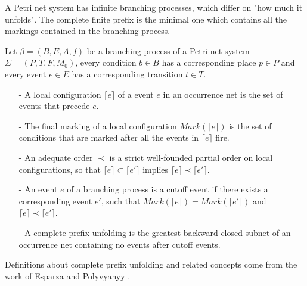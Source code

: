 \documentclass{llncs}
\begin{document}
A Petri net system has infinite branching processes, which differ on "how much it unfolds". The complete finite prefix is the minimal one which contains all the markings contained in the branching process.

\begin{definition}\label{def:cpu}
Let $\beta=(B,E,A,f)$ be a branching process of a Petri net system $\Sigma=(P,T,F,M_{0})$, every condition $b\in B$ has a corresponding place $p\in P$ and every event $e\in E$ has a corresponding transition $t\in T$.
	\begin{itemize}
		\item[-] A local configuration $\lceil e\rceil$ of a event $e$ in an occurrence net is the set of events that precede $e$.
		\item[-] The final marking of a local configuration $Mark(\lceil e\rceil)$ is the set of conditions that are marked after all the events in $\lceil e\rceil$ fire.
		\item[-] An adequate order $\prec$ is a strict well-founded partial order on local configurations, so that $\lceil e\rceil\subset\lceil e'\rceil$ implies $\lceil e\rceil\prec\lceil e'\rceil$.
		\item[-] An event $e$ of a branching process is a cutoff event if there exists a corresponding event $e'$, such that $Mark(\lceil e\rceil)=Mark(\lceil e'\rceil)$ and $\lceil e\rceil\prec\lceil e'\rceil$.
		\item[-] A complete prefix unfolding is the greatest backward closed subnet of an occurrence net containing no events after cutoff events.
	\end{itemize}
\end{definition}

Definitions about complete prefix unfolding and related concepts come from the work of Esparza \cite{esparza1996improvement} and Polyvyanyy \cite{polyvyanyy2010structuring}.
\end{document}
